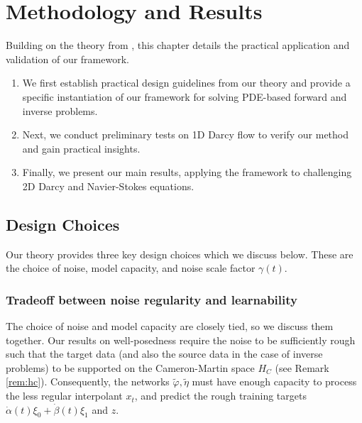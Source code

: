 \chapter{Methodology and Results}\label{cha:4}

\ifpdf
\graphicspath{{Chapter4/Figs/Raster/}{Chapter4/Figs/PDF/}{Chapter4/Figs/}}
\else
\graphicspath{{Chapter4/Figs/Vector/}{Chapter4/Figs/}}
\fi

Building on the theory from , this chapter details the practical application and validation of our framework.
\begin{enumerate}
  \item We first establish practical design guidelines from our theory and provide a specific instantiation of our framework for solving PDE-based forward and inverse problems.
  \item Next, we conduct preliminary tests on 1D Darcy flow to verify our method and gain practical insights.
  \item Finally, we present our main results, applying the framework to challenging 2D Darcy and Navier-Stokes equations.
\end{enumerate}

\section{Design Choices} \label{sec:dp}
Our theory provides three key design choices which we discuss below. These are the choice of noise, model capacity, and noise scale factor \(\gamma(t)\).

\subsection{Tradeoff between noise regularity and learnability}
The choice of noise and model capacity are closely tied, so we discuss them together.  Our results on well-posedness require the noise to be sufficiently rough such that the target data (and also the source data in the case of inverse problems) to be supported on the Cameron-Martin space \(H_{C}\) (see Remark \ref{rem:hc}). Consequently, the networks \(\widetilde{\varphi}, \widetilde{\eta}\) must have enough capacity to process the less regular interpolant \(x_{t}\), and predict the rough training targets \(\dot{\alpha}(t)\xi_{0} + \dot{\beta}(t) \xi_{1}\) and \(z\).

